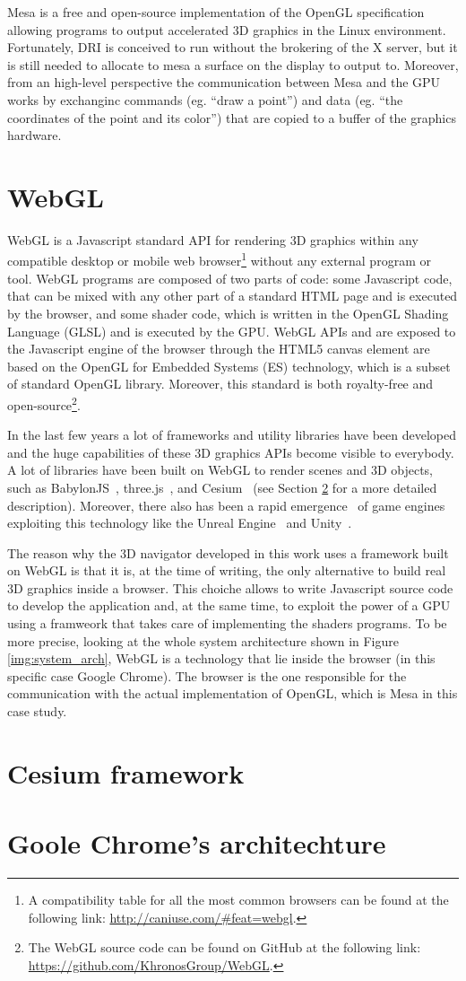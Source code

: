 Mesa is a free and open-source implementation of the OpenGL specification allowing
programs to output accelerated 3D graphics in the Linux environment. Fortunately,
DRI is conceived to run without the brokering of the X server, but it is still
needed to allocate to mesa a surface on the display to output to. Moreover, from
an high-level perspective the communication between Mesa and the GPU works by
exchanginc commands (eg. ``draw a point'') and data (eg. ``the coordinates of the
point and its color'') that are copied to a buffer of the graphics hardware.


\section{WebGL} \label{sec:webgl}
WebGL is a Javascript standard API for rendering 3D graphics within any compatible
desktop or mobile web browser\footnote{A compatibility table for all the most
common browsers can be found at the following link: \url{http://caniuse.com/#feat=webgl}.}
without any external program or tool. WebGL programs are composed of two parts
of code: some Javascript code, that can be mixed with any other part of a standard
HTML page and is executed by the browser, and some shader code, which is written 
in the OpenGL Shading Language (GLSL) and is executed by the GPU.
WebGL APIs and are exposed to the Javascript engine of the browser through the
HTML5 canvas element are based on the OpenGL for Embedded Systems (ES) technology,
which is a subset of standard OpenGL library. Moreover, this standard is both
royalty-free and open-source\footnote{The WebGL source code can be found on GitHub
at the following link: \url{https://github.com/KhronosGroup/WebGL}.}.

In the last few years a lot of frameworks and utility libraries have been developed
and the huge capabilities of these 3D graphics APIs become visible to everybody.
A lot of libraries have been built on WebGL to render scenes and 3D objects, such
as BabylonJS~\cite{babylon3d}, three.js~\cite{cabello2010three}, and 
Cesium~\cite{cozzi20113d} (see Section \ref{sec:cesium} for a more detailed description).
Moreover, there also has been a rapid emergence~\cite{parisi2014programming} of
game engines exploiting this technology like the Unreal Engine~\cite{games2007unreal}
and Unity~\cite{engine9unity}.

The reason why the 3D navigator developed in this work uses a framework built on
WebGL is that it is, at the time of writing, the only alternative to build real
3D graphics inside a browser. This choiche allows to write Javascript source
code to develop the application and, at the same time, to exploit the power of
a GPU using a framweork that takes care of implementing the shaders programs.
To be more precise, looking at the whole system architecture shown in Figure
\ref{img:system_arch}, WebGL is a technology that lie inside the browser
(in this specific case Google Chrome). The browser is the one responsible
for the communication with the actual implementation of OpenGL, which is Mesa
in this case study.



\section{Cesium framework} \label{sec:cesium}


\section{Goole Chrome's architechture}
